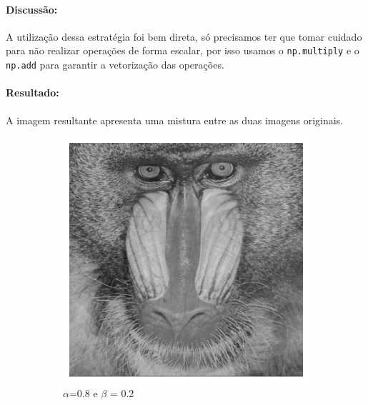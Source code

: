 \documentclass[12pt,a4paper]{report}
\begin{document}
\paragraph{Discussão:} 
A utilização dessa estratégia foi bem direta, só precisamos ter que tomar cuidado para não realizar operações de forma escalar, por isso usamos o \texttt{np.multiply} e o \texttt{np.add} para garantir a vetorização das operações.

\paragraph{Resultado:} 
A imagem resultante apresenta uma mistura entre as duas imagens originais.
\begin{figure}[H]
    \centering
    \begin{subfigure}[b]{0.32\textwidth}
        \includegraphics[width=\textwidth]{imagens/ex7-1.png}
        \caption{\(\alpha\)=0.8 e \(\beta\) = 0.2}
    \end{subfigure}
    \hfill
    \begin{subfigure}[b]{0.32\textwidth}

\end{subfigure}
\end{figure}
\end{document}
